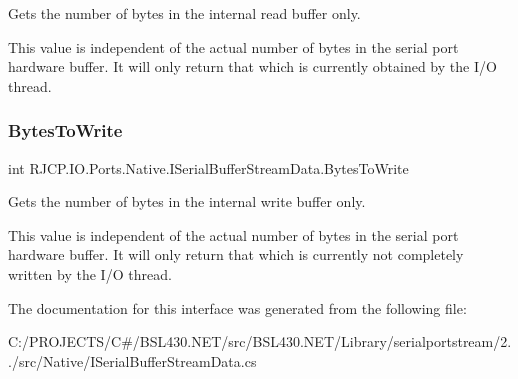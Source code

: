Gets the number of bytes in the internal read buffer only. 

This value is independent of the actual number of bytes in the serial port hardware buffer. It will only return that which is currently obtained by the I/O thread. \mbox{\label{interface_r_j_c_p_1_1_i_o_1_1_ports_1_1_native_1_1_i_serial_buffer_stream_data_a20b8a4c6adb372f23e6a609c513eca85}} 
\subsubsection{\texorpdfstring{BytesToWrite}{BytesToWrite}}
{\footnotesize\ttfamily int R\+J\+C\+P.\+I\+O.\+Ports.\+Native.\+I\+Serial\+Buffer\+Stream\+Data.\+Bytes\+To\+Write\hspace{0.3cm}{\ttfamily [get]}}



Gets the number of bytes in the internal write buffer only. 

This value is independent of the actual number of bytes in the serial port hardware buffer. It will only return that which is currently not completely written by the I/O thread. 

The documentation for this interface was generated from the following file\+:\begin{DoxyCompactItemize}
\item 
C\+:/\+P\+R\+O\+J\+E\+C\+T\+S/\+C\#/\+B\+S\+L430.\+N\+E\+T/src/\+B\+S\+L430.\+N\+E\+T/\+Library/serialportstream/2../src/\+Native/I\+Serial\+Buffer\+Stream\+Data.\+cs\end{DoxyCompactItemize}
